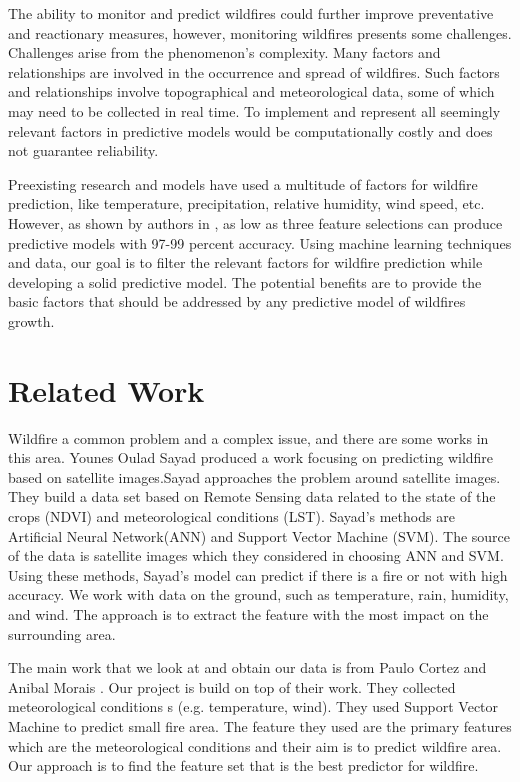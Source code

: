 \documentclass[conference]{IEEEtran}
\begin{document}
The ability to monitor and predict wildfires could further improve preventative and reactionary measures, however, monitoring wildfires presents some challenges. Challenges arise from the phenomenon's complexity. Many factors and relationships are involved in the occurrence and spread of wildfires. Such factors and relationships involve topographical and meteorological data, some of which may need to be collected in real time. To implement and represent all seemingly relevant factors in predictive models would be computationally costly and does not guarantee reliability.

Preexisting research and models have used a multitude of factors for wildfire prediction, like temperature, precipitation, relative humidity, wind speed, etc. However, as shown by authors in \cite{b2}, as low as three feature selections can produce predictive models with 97-99 percent accuracy. Using  machine learning techniques and data, our goal is to filter the relevant factors for wildfire prediction while developing a solid predictive model. The potential benefits are to provide the basic factors that should be addressed by any predictive model of wildfires growth.

\section{Related Work}
Wildfire a common problem and a complex issue, and there are some works in this area. Younes Oulad Sayad produced a work focusing on predicting wildfire based on satellite images\cite{b2}.Sayad approaches the problem around satellite images. They build a data set based on Remote Sensing data related to the state of the crops (NDVI) and meteorological conditions (LST). Sayad's methods are Artificial Neural Network(ANN) and Support Vector Machine (SVM). The source of the data is satellite images which they considered in choosing ANN and SVM. Using these methods, Sayad's model can predict if there is a fire or not with high accuracy. We work with data on the ground, such as temperature, rain, humidity, and wind. The approach is to extract the feature with the most impact on the surrounding area.

The main work that we look at and obtain our data is from Paulo Cortez and Anibal Morais \cite{b1}. Our project is build on top of their work. They collected meteorological conditions s (e.g. temperature, wind). They used Support Vector Machine to predict small fire area. The feature they used are the primary features which are the meteorological conditions and their aim is to predict wildfire area. Our approach is to find the feature set that is the best predictor for wildfire. 
\end{document}
